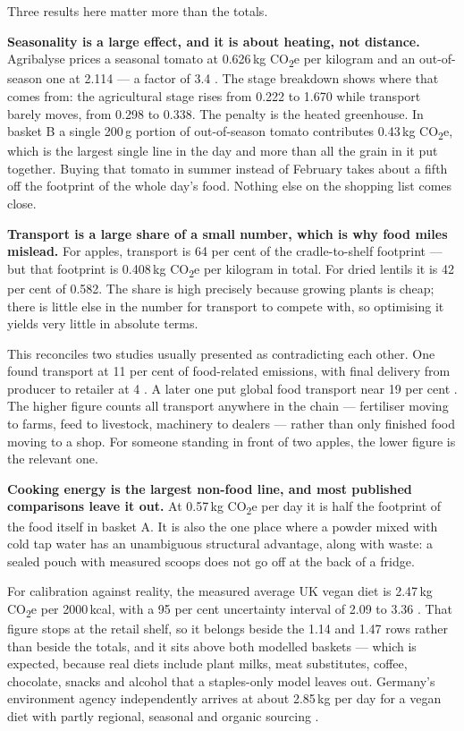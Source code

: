 \documentclass[11pt,a4paper]{article}
\newcommand{\co}{CO\textsubscript{2}e}
\begin{document}
Three results here matter more than the totals.

\textbf{Seasonality is a large effect, and it is about heating, not distance.}
Agribalyse prices a seasonal tomato at 0.626\,kg \co{} per kilogram and an
out-of-season one at 2.114 — a factor of 3.4 \cite{agribalyse}. The stage breakdown
shows where that comes from: the agricultural stage rises from 0.222 to 1.670 while
transport barely moves, from 0.298 to 0.338. The penalty is the heated greenhouse. In
basket B a single 200\,g portion of out-of-season tomato contributes 0.43\,kg \co{},
which is the largest single line in the day and more than all the grain in it put
together. Buying that tomato in summer instead of February takes about a fifth off
the footprint of the whole day's food. Nothing else on the shopping list comes close.

\textbf{Transport is a large share of a small number, which is why food miles
mislead.} For apples, transport is 64 per cent of the cradle-to-shelf footprint — but
that footprint is 0.408\,kg \co{} per kilogram in total. For dried lentils it is 42
per cent of 0.582. The share is high precisely because growing plants is cheap; there
is little else in the number for transport to compete with, so optimising it yields
very little in absolute terms.

This reconciles two studies usually presented as contradicting each other. One found
transport at 11 per cent of food-related emissions, with final delivery from producer
to retailer at 4 \cite{weber}. A later one put global food transport near 19 per cent
\cite{li}. The higher figure counts all transport anywhere in the chain — fertiliser
moving to farms, feed to livestock, machinery to dealers — rather than only finished
food moving to a shop. For someone standing in front of two apples, the lower figure
is the relevant one.

\textbf{Cooking energy is the largest non-food line, and most published comparisons
leave it out.} At 0.57\,kg \co{} per day it is half the footprint of the food itself
in basket A. It is also the one place where a powder mixed with cold tap water has an
unambiguous structural advantage, along with waste: a sealed pouch with measured
scoops does not go off at the back of a fridge.

For calibration against reality, the measured average UK vegan diet is 2.47\,kg \co{}
per 2000\,kcal, with a 95 per cent uncertainty interval of 2.09 to 3.36
\cite{scarborough}. That figure stops at the retail shelf, so it belongs beside the
1.14 and 1.47 rows rather than beside the totals, and it sits above both modelled
baskets — which is expected, because real diets include plant milks, meat
substitutes, coffee, chocolate, snacks and alcohol that a staples-only model leaves
out. Germany's environment agency independently arrives at about 2.85\,kg per day for
a vegan diet with partly regional, seasonal and organic sourcing \cite{uba-food}.
\end{document}
